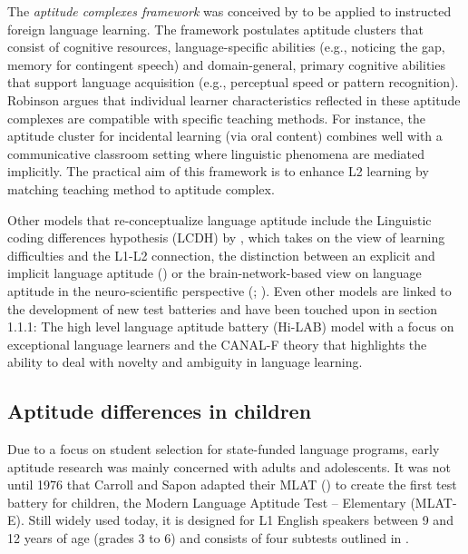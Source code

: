 \documentclass[output=paper]{langscibook}
\begin{document}
The \textit{aptitude complexes framework} was conceived by \citet{Robinson2001,Robinson2002} to be applied to instructed foreign language learning. The framework postulates aptitude clusters that consist of cognitive resources, language-specific abilities (e.g., noticing the gap, memory for contingent speech) and domain-gen\-er\-al, primary cognitive abilities that support language acquisition (e.g., perceptual speed or pattern recognition). Robinson argues that individual learner characteristics reflected in these aptitude complexes are compatible with specific teaching methods. For instance, the aptitude cluster for incidental learning (via oral content) combines well with a communicative classroom setting where linguistic phenomena are mediated implicitly. The practical aim of this framework is to enhance L2 learning by matching teaching method to aptitude complex.

Other models that re-conceptualize language aptitude include the Linguistic coding differences hypothesis (LCDH) by \citet{SparksGanschow1991}, which takes on the view of learning difficulties and the L1-L2 connection, the distinction between an explicit and implicit language aptitude (\citealt{Granena2012,Granena2016}) or the brain-network-based view on language aptitude in the neuro-scientific perspective (\citealt{GolestaniEtAl2011}; \citealt{ReitererEtAl2013}). Even other models are linked to the development of new test batteries and have been touched upon in section 1.1.1: The high level language aptitude battery (Hi-LAB) model with a focus on exceptional language learners and the CANAL-F theory that highlights the ability to deal with novelty and ambiguity in language learning. 

\subsection{Aptitude differences in children} %

Due to a focus on student selection for state-funded language programs, early aptitude research was mainly concerned with adults and adolescents. It was not until 1976 that Carroll and Sapon adapted their MLAT (\citealt{CarrollSapon1959}) to create the first test battery for children, the Modern Language Aptitude Test – Elementary (MLAT-E). Still widely used today, it is designed for L1 English speakers between 9 and 12 years of age (grades 3 to 6) and consists of four subtests outlined in .
\end{document}
